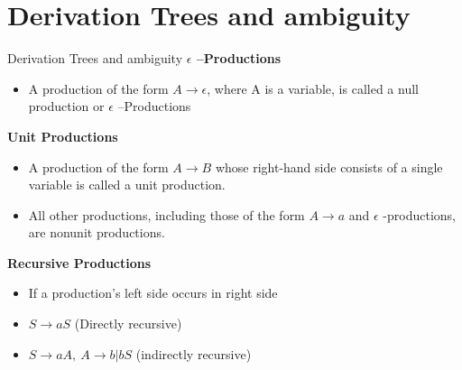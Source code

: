 \documentclass{beamer}
\begin{document}
\section{Derivation Trees and ambiguity}
\begin{frame}{Derivation Trees and ambiguity}
\textbf{$\epsilon$ –Productions}
\begin{itemize}
	\item A production of the form $A \rightarrow \epsilon$, where A is a variable, is called a null 	production or $\epsilon$ –Productions
\end{itemize}
\textbf{Unit Productions}
\begin{itemize}
	\item A production of the form $A \rightarrow B$ whose right-hand side consists of a single 
	variable is called a unit production. 
	\item All other productions, including those of the form $A \rightarrow a$ and $\epsilon$ -productions, 
	are nonunit productions.

\end{itemize}
\textbf{Recursive Productions}
\begin{itemize}
	\item If a production's left side occurs in right side
	\item $S\rightarrow aS$ (Directly recursive)
	\item $S\rightarrow aA, \ A\rightarrow b|bS$ (indirectly recursive)
\end{itemize}
\end{frame}
\end{document}
